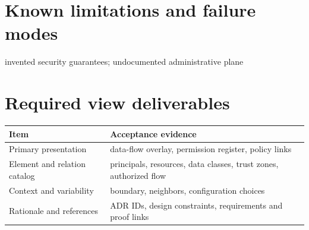 \documentclass[10pt,letterpaper]{article}
\begin{document}
\section{Known limitations and failure modes}
invented security guarantees; undocumented administrative plane

\section{Required view deliverables}
\small
\begin{tabularx}{\linewidth}{@{}YY@{}}
\toprule
\textbf{Item} & \textbf{Acceptance evidence} \\
\midrule
Primary presentation & data-flow overlay, permission register, policy links \\
Element and relation catalog & principals, resources, data classes, trust zones, authorized flow \\
Context and variability & boundary, neighbors, configuration choices \\
Rationale and references & ADR IDs, design constraints, requirements and proof links \\
\bottomrule
\end{tabularx}
\normalsize
\end{document}
